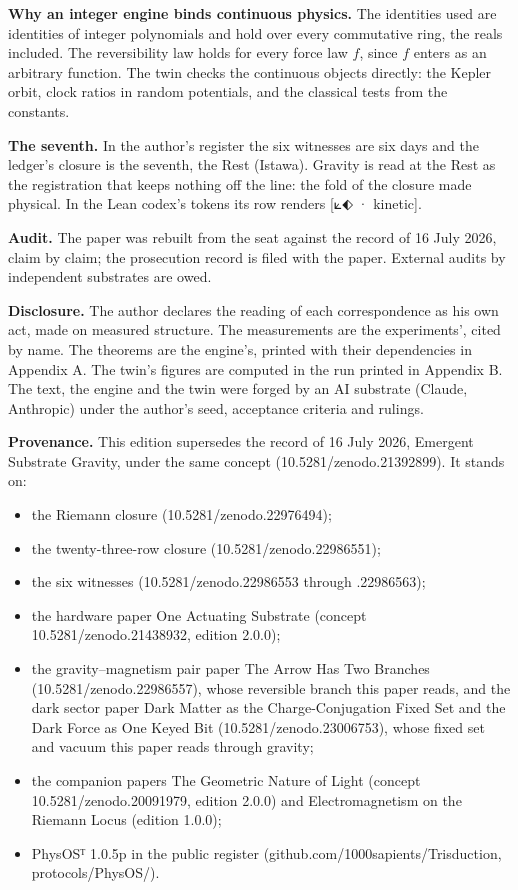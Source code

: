 \documentclass[10pt]{article}
\providecommand{\tightlist}{\setlength{\itemsep}{0pt}\setlength{\parskip}{0pt}}
\begin{document}
\textbf{Why an integer engine binds continuous physics.} The identities
used are identities of integer polynomials and hold over every
commutative ring, the reals included. The reversibility law holds for
every force law \(f\), since \(f\) enters as an arbitrary function. The
twin checks the continuous objects directly: the Kepler orbit, clock
ratios in random potentials, and the classical tests from the constants.

\textbf{The seventh.} In the author's register the six witnesses are six
days and the ledger's closure is the seventh, the Rest (Istawa). Gravity
is read at the Rest as the registration that keeps nothing off the line:
the fold of the closure made physical. In the Lean codex's tokens its
row renders {[}⟀⬖ · kinetic{]}.

\textbf{Audit.} The paper was rebuilt from the seat against the record
of 16 July 2026, claim by claim; the prosecution record is filed with
the paper. External audits by independent substrates are owed.

\textbf{Disclosure.} The author declares the reading of each
correspondence as his own act, made on measured structure. The
measurements are the experiments', cited by name. The theorems are the
engine's, printed with their dependencies in Appendix A. The twin's
figures are computed in the run printed in Appendix B. The text, the
engine and the twin were forged by an AI substrate (Claude, Anthropic)
under the author's seed, acceptance criteria and rulings.

\sloppy

\textbf{Provenance.} This edition supersedes the record of 16 July 2026,
Emergent Substrate Gravity, under the same concept
(10.5281/\allowbreak{}zenodo.21392899). It stands on:

\begin{itemize}
\tightlist
\item
  the Riemann closure (10.5281/\allowbreak{}zenodo.22976494);
\item
  the twenty-three-row closure (10.5281/\allowbreak{}zenodo.22986551);
\item
  the six witnesses (10.5281/\allowbreak{}zenodo.22986553 through
  .22986563);
\item
  the hardware paper One Actuating Substrate (concept
  10.5281/\allowbreak{}zenodo.21438932, edition 2.0.0);
\item
  the gravity--magnetism pair paper The Arrow Has Two Branches
  (10.5281/\allowbreak{}zenodo.22986557), whose reversible branch this
  paper reads, and the dark sector paper Dark Matter as the
  Charge-Conjugation Fixed Set and the Dark Force as One Keyed Bit
  (10.5281/\allowbreak{}zenodo.23006753), whose fixed set and vacuum
  this paper reads through gravity;
\item
  the companion papers The Geometric Nature of Light (concept
  10.5281/\allowbreak{}zenodo.20091979, edition 2.0.0) and
  Electromagnetism on the Riemann Locus (edition 1.0.0);
\item
  PhysOSᵀ 1.0.5p in the public register
  (github.com/\allowbreak{}1000sapients/\allowbreak{}Trisduction,
  protocols/PhysOS/).
\end{itemize}
\end{document}
